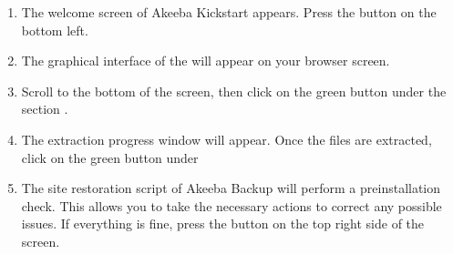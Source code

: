 \documentclass[a4paper,10pt,english,openany,oneside]{sphinxmanual}
\begin{document}
\begin{sloppypar}
\begin{enumerate}
\sphinxAtStartPar
{}

\item {} 
\sphinxAtStartPar
The welcome screen of Akeeba Kickstart appears. Press the button  on the bottom left.

\begin{figure}[H]
\centering

\noindent{}
\end{figure}

\item {} 
\sphinxAtStartPar
The graphical interface of the  will appear on your browser screen.

\begin{figure}[H]
\centering

\noindent{}
\end{figure}

\item {} 
\sphinxAtStartPar
Scroll to the bottom of the screen, then click on the  green button under the section .

\begin{figure}[H]
\centering

\noindent{}
\end{figure}

\item {} 
\sphinxAtStartPar
The extraction progress window will appear. Once the files are extracted, click on the green button  under 

\begin{figure}[H]
\centering

\noindent{}
\end{figure}

\item {} 
\sphinxAtStartPar
The site restoration script of Akeeba Backup will perform a pre\sphinxhyphen{}installation check. This allows you to take the necessary actions to correct any possible issues. If everything is fine, press the button  on the top right side of the screen.


\end{enumerate}
\end{sloppypar}
\end{document}
